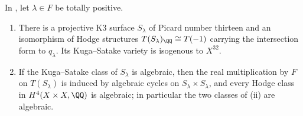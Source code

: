 \begin{theorem}\label{thm:mumfordks}
In , let $\lambda\in F$ be totally positive.
\begin{enumerate}[label=\textup{(\roman*)},nosep,leftmargin=2.6em]
\item There is a projective K3 surface $S_{\lambda}$ of Picard number
  thirteen and an isomorphism of Hodge structures
  $T(S_{\lambda})_{\QQ}\cong T(-1)$ carrying the intersection form to
  $q_{\lambda}$. Its Kuga--Satake variety is isogenous to $X^{32}$.
\item If the Kuga--Satake class of $S_{\lambda}$ is algebraic, then the real
  multiplication by $F$ on $T(S_{\lambda})$ is induced by algebraic cycles on
  $S_{\lambda}\times S_{\lambda}$, and every Hodge class in
  $H^{4}(X\times X,\QQ)$ is algebraic; in particular the two classes of
  (ii) are algebraic.
\end{enumerate}
\end{theorem}

